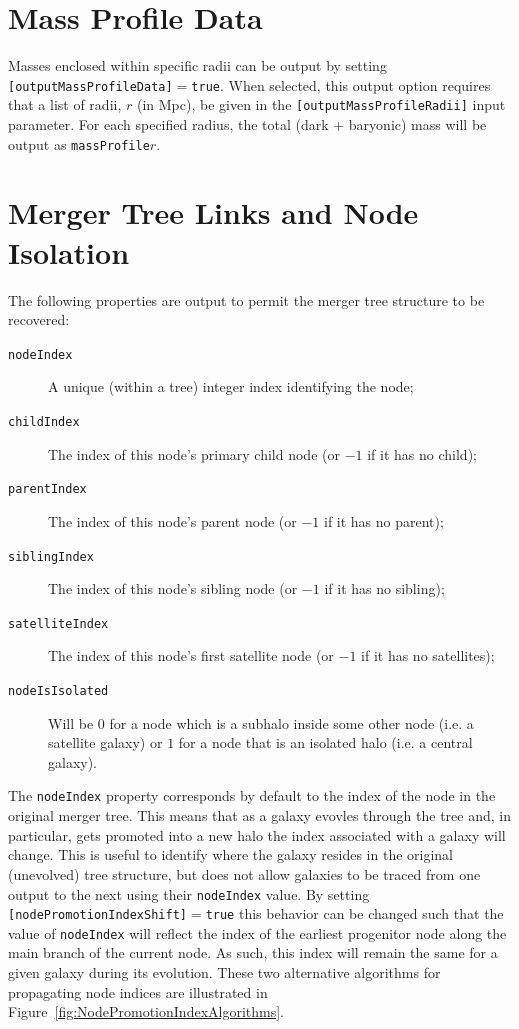 \section{Mass Profile Data}

Masses enclosed within specific radii can be output by setting {\tt [outputMassProfileData]}$=${\tt true}. When selected, this output option requires that a list of radii, $r$ (in Mpc), be given in the {\tt [outputMassProfileRadii]} input parameter. For each specified radius, the total (dark + baryonic) mass will be output as {\tt massProfile}$r$.

\section{Merger Tree Links and Node Isolation}

The following properties are output to permit the merger tree structure to be recovered:
\begin{description}
 \item [{\tt nodeIndex}] A unique (within a tree) integer index identifying the node;
 \item [{\tt childIndex}] The index of this node's primary child node (or $-1$ if it has no child);
 \item [{\tt parentIndex}] The index of this node's parent node (or $-1$ if it has no parent);
 \item [{\tt siblingIndex}] The index of this node's sibling node (or $-1$ if it has no sibling);
 \item [{\tt satelliteIndex}] The index of this node's first satellite node (or $-1$ if it has no satellites);
 \item [{\tt nodeIsIsolated}] Will be $0$ for a node which is a subhalo inside some other node (i.e. a satellite galaxy) or $1$ for a node that is an isolated halo (i.e. a central galaxy).
\end{description}

The {\tt nodeIndex} property corresponds by default to the index of the node in the original merger tree. This means that as a galaxy evovles through the tree and, in particular, gets promoted into a new halo the index associated with a galaxy will change. This is useful to identify where the galaxy resides in the original (unevolved) tree structure, but does not allow galaxies to be traced from one output to the next using their {\tt nodeIndex} value. By setting {\tt [nodePromotionIndexShift]}$=${\tt true} this behavior can be changed such that the value of {\tt nodeIndex} will reflect the index of the earliest progenitor node along the main branch of the current node. As such, this index will remain the same for a given galaxy during its evolution. These two alternative algorithms for propagating node indices are illustrated in Figure~\ref{fig:NodePromotionIndexAlgorithms}.

